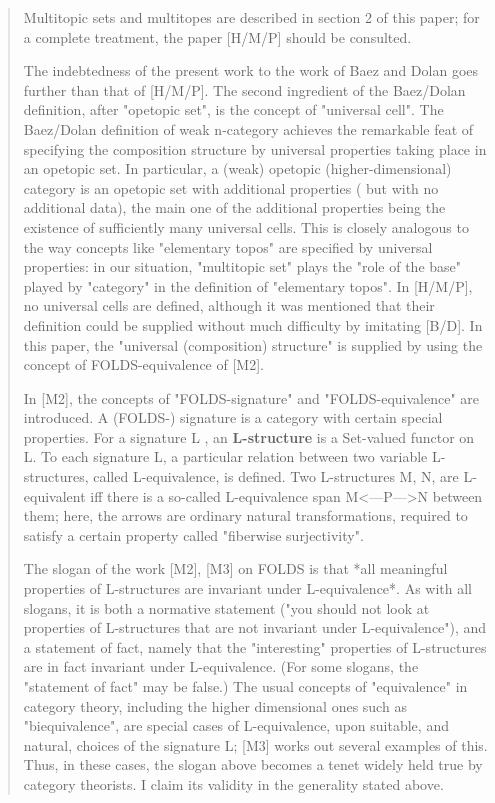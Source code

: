 \begin{quote}
Multitopic sets and multitopes are described in section 2 of this paper;
for a complete treatment, the paper [H/M/P] should be consulted.

The indebtedness of the present work to the work of Baez and Dolan goes
further than that of [H/M/P]. The second ingredient of the Baez/Dolan
definition, after "opetopic set", is the concept of "universal cell". The
Baez/Dolan definition of weak n-category achieves the remarkable feat of
specifying the composition structure by universal properties taking place
in an opetopic set. In particular, a (weak) opetopic (higher-dimensional)
category is an opetopic set with additional properties ( but with no
additional data), the main one of the additional properties being the
existence of sufficiently many universal cells. This is closely analogous
to the way concepts like "elementary topos" are specified by universal
properties: in our situation, "multitopic set" plays the "role of the
base" played by "category" in the definition of "elementary topos". In
[H/M/P], no universal cells are defined, although it was mentioned that
their definition could be supplied without much difficulty by imitating
[B/D]. In this paper, the "universal (composition) structure" is supplied
by using the concept of FOLDS-equivalence of [M2].

In [M2], the concepts of "FOLDS-signature" and "FOLDS-equivalence" are
introduced. A (FOLDS-) signature is a category with certain special
properties. For a signature L , an \textbf{L-structure} is a Set-valued functor
on L. To each signature L, a particular relation between two variable
L-structures, called L-equivalence, is defined. Two L-structures M, N, are
L-equivalent iff there is a so-called L-equivalence span M<---P--->N
between them; here, the arrows are ordinary natural transformations,
required to satisfy a certain property called "fiberwise surjectivity".

The slogan of the work [M2], [M3] on FOLDS is that *all meaningful
properties of L-structures are invariant under L-equivalence*. As with all
slogans, it is both a normative statement ("you should not look at
properties of L-structures that are not invariant under L-equivalence"),
and a statement of fact, namely that the "interesting" properties of
L-structures are in fact invariant under L-equivalence. (For some slogans,
the "statement of fact" may be false.) The usual concepts of "equivalence"
in category theory, including the higher dimensional ones such as
"biequivalence", are special cases of L-equivalence, upon suitable, and
natural, choices of the signature L; [M3] works out several examples of
this. Thus, in these cases, the slogan above becomes a tenet widely held
true by category theorists. I claim its validity in the generality stated
above.


\end{quote}

